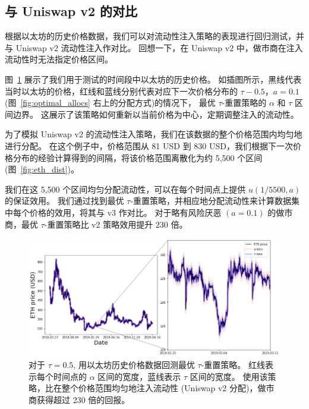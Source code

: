 \documentclass[sigconf, dvipsnames]{acmart}
\begin{document}
\subsection{与 Uniswap v2 的对比}

\quad 根据以太坊的历史价格数据，我们可以对流动性注入策略的表现进行回归测试，并与 Uniswap v2 流动性注入作对比。
回想一下，在 Uniswap v2 中，做市商在注入流动性时无法指定价格区间。

图~\ref{fig:eth_price} 展示了我们用于测试的时间段中以太坊的历史价格。
如插图所示，黑线代表当时以太坊的价格，红线和蓝线分别代表对应下一次价格分布的 $\tau-0.5$，$a=0.1$ (图~\ref{fig:optimal_allocs} 右上的分配方式)的情况下， 
最优 $\tau$-重置策略的  $\alpha$ 和 $\tau$ 区间边界。 
这展示了该策略如何重新以当前价格为中心，定期调整注入的流动性。

为了模拟 Uniswap v2 的流动性注入策略，我们在该数据的整个价格范围内均匀地进行分配。
在这个例子中，价格范围从 81 USD 到 830 USD，我们根据下一次价格分布的经验计算得到的间隔，将该价格范围离散化为约 5,500 个区间 (图~\ref{fig:eth_dist})。

我们在这 5,500 个区间均匀分配流动性，可以在每个时间点上提供 $u(1/5500, a)$ 的保证效用。
我们通过找到最优 $\tau$-重置策略，并相应地分配流动性来计算数据集中每个价格的效用，将其与 v3 作对比。
对于略有风险厌恶 $(a=0.1)$ 的做市商，最优 $\tau$-重置策略比 v2 策略效用提升 $230$ 倍。

\begin{figure}
    \centering
    \includegraphics[width=0.7\linewidth]{img/eth_price.png}
    \caption{ 对于 $\tau=0.5$, 用以太坊历史价格数据回测最优 $\tau$-重置策略。
    红线表示每个时间点的 $\alpha$ 区间的宽度，蓝线表示 $\tau$ 区间的宽度。
    使用该策略，比在整个价格范围均匀地注入流动性 (Uniswap v2 分配)，做市商获得超过 230 倍的回报。 
    \label{fig:eth_price}}
\end{figure}

\end{document}

